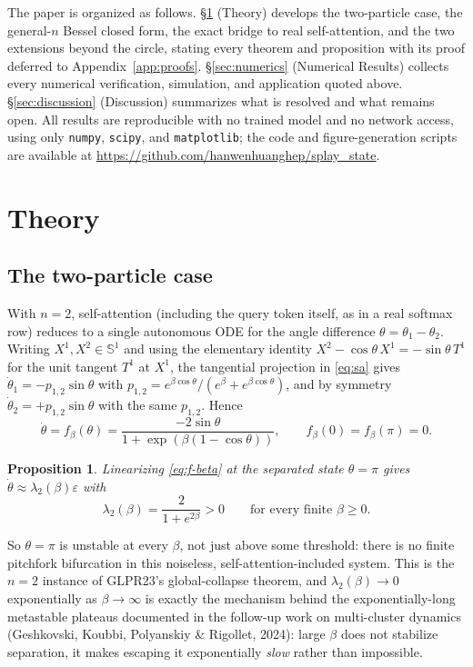 \documentclass[11pt]{article}
\newtheorem{proposition}[theorem]{Proposition}
\begin{document}
The paper is organized as follows. \S\ref{sec:theory} (Theory) develops the two-particle case, the general-$n$ Bessel closed form, the exact bridge to real self-attention, and the two extensions beyond the circle, stating every theorem and proposition with its proof deferred to Appendix~\ref{app:proofs}. \S\ref{sec:numerics} (Numerical Results) collects every numerical verification, simulation, and application quoted above. \S\ref{sec:discussion} (Discussion) summarizes what is resolved and what remains open. All results are reproducible with no trained model and no network access, using only \texttt{numpy}, \texttt{scipy}, and \texttt{matplotlib}; the code and figure-generation scripts are available at \url{https://github.com/hanwenhuanghep/splay_state}.

\section{Theory}
\label{sec:theory}

\subsection{The two-particle case}
\label{sec:n2}

With $n=2$, self-attention (including the query token itself, as in a real softmax row) reduces to a single autonomous ODE for the angle difference $\theta=\theta_1-\theta_2$. Writing $X^1,X^2\in\mathbb{S}^1$ and using the elementary identity $X^2-\cos\theta\,X^1 = -\sin\theta\,T^1$ for the unit tangent $T^1$ at $X^1$, the tangential projection in \eqref{eq:sa} gives $\dot\theta_1 = -p_{1,2}\sin\theta$ with $p_{1,2}=e^{\beta\cos\theta}/(e^\beta+e^{\beta\cos\theta})$, and by symmetry $\dot\theta_2=+p_{1,2}\sin\theta$ with the same $p_{1,2}$. Hence
\begin{equation}
    \dot\theta = f_\beta(\theta) = \frac{-2\sin\theta}{1+\exp(\beta(1-\cos\theta))}, \qquad f_\beta(0)=f_\beta(\pi)=0.
    \label{eq:f-beta}
\end{equation}

\begin{proposition}
\label{prop:n2}
Linearizing \eqref{eq:f-beta} at the separated state $\theta=\pi$ gives $\dot\theta\approx\lambda_2(\beta)\varepsilon$ with
\begin{equation}
    \lambda_2(\beta) = \frac{2}{1+e^{2\beta}} > 0 \qquad\text{for every finite } \beta\ge0.
\end{equation}
\end{proposition}
So $\theta=\pi$ is unstable at every $\beta$, not just above some threshold: there is no finite pitchfork bifurcation in this noiseless, self-attention-included system. This is the $n=2$ instance of GLPR23's global-collapse theorem, and $\lambda_2(\beta)\to0$ exponentially as $\beta\to\infty$ is exactly the mechanism behind the exponentially-long metastable plateaus documented in the follow-up work on multi-cluster dynamics (Geshkovski, Koubbi, Polyanskiy \& Rigollet, 2024): large $\beta$ does not stabilize separation, it makes escaping it exponentially \emph{slow} rather than impossible.
\end{document}
